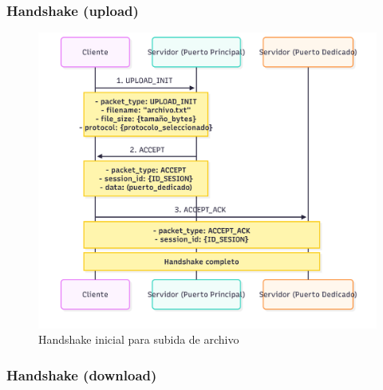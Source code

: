 \subsubsection{Handshake (upload)}

\begin{figure}[H]
    \centering
    \includegraphics[width=1\linewidth]{images/UPLOAD_HANDSHAKE}
    \caption{Handshake inicial para subida de archivo}
    \label{fig:upload_handshake}
\end{figure}

\subsubsection{Handshake (download)}

